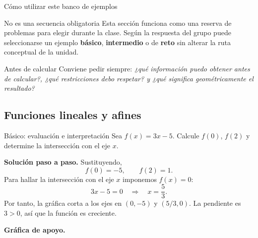 \documentclass[aspectratio=169,10pt]{beamer}
\begin{document}
\begin{frame}{Cómo utilizar este banco de ejemplos}
\begin{block}{No es una secuencia obligatoria}
Esta sección funciona como una reserva de problemas para elegir durante la clase. Según la respuesta del grupo puede seleccionarse un ejemplo \textbf{básico}, \textbf{intermedio} o de \textbf{reto} sin alterar la ruta conceptual de la unidad.
\end{block}
\begin{alertblock}{Antes de calcular}
Conviene pedir siempre: \emph{¿qué información puedo obtener antes de calcular?, ¿qué restricciones debo respetar? y ¿qué significa geométricamente el resultado?}
\end{alertblock}
\end{frame}

\subsection{Funciones lineales y afines}

\begin{frame}{Básico: evaluación e interpretación}
Sea $f(x)=3x-5$. Calcule $f(0)$, $f(2)$ y determine la intersección con el eje $x$.

\textbf{Solución paso a paso.} Sustituyendo,
\[
f(0)=-5,\qquad f(2)=1.
\]
Para hallar la intersección con el eje $x$ imponemos $f(x)=0$:
\[
3x-5=0\quad\Longrightarrow\quad x=\frac53.
\]
Por tanto, la gráfica corta a los ejes en $(0,-5)$ y $(5/3,0)$. La pendiente es $3>0$, así que la función es creciente.


\textbf{Gráfica de apoyo.}\medskip
\begin{center}
\end{center}

\end{frame}
\end{document}
